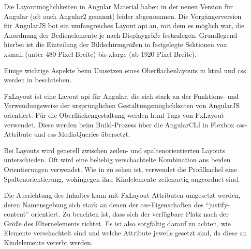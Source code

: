 

Die Layoutmöglichkeiten in Angular Material haben in der neuen Version für Angular (oft auch Angular2 genannt) leider abgenommen.
Die Vorgängerversion für AngularJS bot ein umfangreiches Layout \gls{api} an, mit dem es möglich war, die Anordnung der Bedienelemente je nach
Displaygröße festzulegen. Grundlegend hierbei ist die Einteilung der Bildschirmgrößen in festgelegte Sektionen von xsmall (unter 480 Pixel Breite) bis xlarge (ab 1920 Pixel Breite).

Einige wichtige Aspekte beim Umsetzen eines Oberflächenlayouts in \gls{html} und \gls{css} werden in  beschrieben.



FxLayout ist eine Layout \gls{api} für Angular, die sich stark an der Funktions- und Verwendungsweise der ursprünglichen Gestaltungsmöglichkeiten von AngularJS orientiert.
Für die Oberflächengestaltung werden \gls{html}-Tags von FxLayout verwendet. Diese werden beim Build-Prozess über die AngularCLI in Flexbox \gls{css}-Attribute und \gls{css}-MediaQueries übersetzt.


Bei Layouts wird generell zwischen zeilen- und spaltenorientierten Layouts unterschieden. Oft wird eine beliebig verschachtelte Kombination aus beiden Orientierungen verwendet. Wie in  zu sehen ist, verwendet die Profilkachel eine Spaltenorientierung, wohingegen ihre Kindelemente zeilenartig angeordnet sind.


Die Ausrichtung des Inhaltes kann mit FxLayout-Attributen umgesetzt werden, deren Namensgebung sich stark an denen der \gls{css}-Eigenschaften des \enquote{justify-content} orientiert.
Zu beachten ist, dass sich der verfügbare Platz nach der Größe des Elternelements richtet. Es ist also sorgfältig darauf zu achten, wie Elemente verschachtelt sind und welche
Attribute jeweils gesetzt sind, da diese an Kindelemente vererbt werden.
